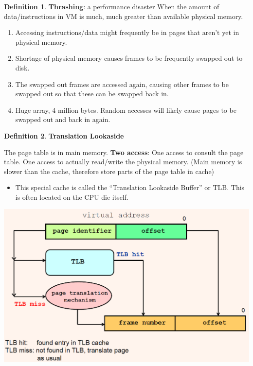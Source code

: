 \documentclass[11pt,a4paper]{article}
\theoremstyle{definition}
\newtheorem{definition}{Definition}[section]
\newenvironment{myitemize}
{ \begin{itemize}
    \setlength{\itemsep}{5pt}
    \setlength{\parskip}{0pt}
    \setlength{\parsep}{0pt}     }
{ \end{itemize}                  }
\newenvironment{myenumerate}
{ \begin{enumerate}
    \setlength{\itemsep}{5pt}
    \setlength{\parskip}{0pt}
    \setlength{\parsep}{0pt}     }
{ \end{enumerate}                }
\begin{document}
\begin{definition}{\textbf{Thrashing}}: a performance disaster
	When the amount of data/instructions in VM is much, much greater than available physical memory.
	\begin{myenumerate}
		\item Accessing instructions/data might frequently be in pages that aren't yet in physical memory.
		\item Shortage of physical memory causes frames to be frequently swapped out to disk.
		\item The swapped out frames are accessed again, causing other frames to be swapped out so that these can be swapped back in.
		\item Huge array, 4 million bytes. Random accesses will likely cause pages to be swapped out and back in again.
	\end{myenumerate}
\end{definition}

\begin{definition}{\textbf{Translation Lookaside}}

\begin{minipage}{0.5\linewidth}
	The page table is in main memory. \textbf{Two access}: One access to consult the page table. One access to actually read/write the physical memory. (Main memory is slower than the cache, therefore store parts of the page table in cache)
	\begin{myitemize}
		\item This special cache is called the ``Translation Lookaside Buffer'' or TLB. This is often located on the CPU die itself.

	\end{myitemize}
\end{minipage}\hspace{5mm}
\begin{minipage}{0.4\linewidth}
	\includegraphics[width=\linewidth]{m5/translationLookasideBuffer}
\end{minipage}
	

\end{definition}
\end{document}
